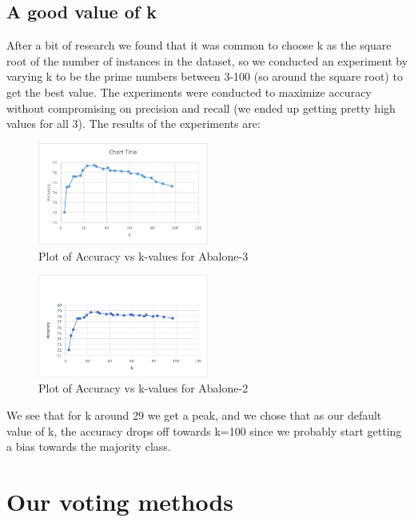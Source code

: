 \subsection{A good value of k}

After a bit of research we found that it was common to choose k as the square root of the number of instances in the dataset, so we conducted an experiment by varying k to be the prime numbers between 3-100 (so around the square root) to get the best value. The experiments were conducted to maximize accuracy without compromising on precision and recall (we ended up getting pretty high values for all 3). The results of the experiments are: 

\begin{figure}[!htb]
\centering

\includegraphics[width=0.5\textwidth]{k_accuracies_3.png}
\caption{Plot of Accuracy vs k-values for Abalone-3}
\end{figure}

\begin{figure}[!htb]
\centering

\includegraphics[width=0.5\textwidth]{k_accuracies_2.png}
\caption{Plot of Accuracy vs k-values for Abalone-2}
\end{figure}

We see that for k around 29 we get a peak, and we chose that as our default value of k, the accuracy drops off towards k=100 since we probably start getting a bias towards the majority class. 




\section{Our voting methods}

